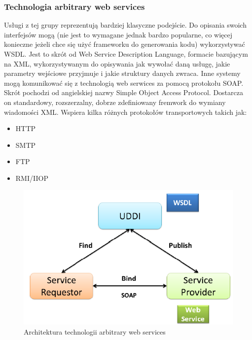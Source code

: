 \subsubsection{Technologia arbitrary web services}
Usługi z tej grupy reprezentują bardziej klasyczne podejście. Do opisania swoich interfejsów mogą (nie jest to wymagane jednak bardzo popularne, co więcej konieczne jeżeli chce się użyć frameworku do generowania kodu) wykorzystywać WSDL. Jest to skrót od Web Service Description Language, formacie bazującym na XML, wykorzystywanym do opisywania jak wywołać daną usługę, jakie parametry wejściowe przyjmuje i jakie struktury danych zwraca. Inne systemy mogą komunikować się z technologią web serwices za pomocą protokołu SOAP. Skrót pochodzi od angielskiej nazwy Simple Object Access Protocol. Dostarcza on standardowy, rozszerzalny, dobrze zdefiniowany fremwork do wymiany wiadomości XML. Wspiera kilka różnych protokołów transportowych takich jak:
 \begin{itemize}
	\item HTTP
	\item SMTP
	\item FTP
	\item RMI/IIOP
\end{itemize}  
\begin{figure}[!h]
	\centering
	\includegraphics[scale=0.50]{webSerwisyArchitektura.png} 
	\caption{Architektura technologii arbitrary web services}
\end{figure}

